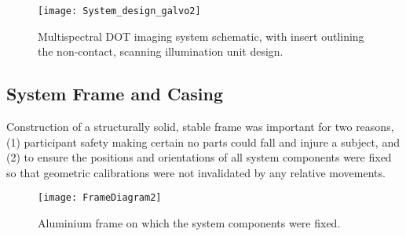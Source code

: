 \documentclass[twoside]{bhamthesis}
\theoremstyle{definition}
\begin{document}
\begin{figure}[!ht]
\centering
  \texttt{[image: System\_design\_galvo2]}
\caption{Multispectral DOT imaging system schematic, with insert outlining the non-contact, scanning illumination unit design.}
  \label{fig:final_system_design}
\end{figure}

\subsection{System Frame and Casing}

Construction of a structurally solid, stable frame was important for two reasons, (1) participant safety making certain no parts could fall and injure a subject, and (2) to ensure the positions and orientations of all system components were fixed so that geometric calibrations were not invalidated by any relative movements. 

\begin{figure}[!ht]
\centering
  \texttt{[image: FrameDiagram2]}
\caption{Aluminium frame on which the system components were fixed.}
  \label{fig:FrameDiagram2}
\end{figure} 
\end{document}
